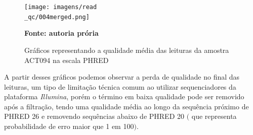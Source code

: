 \begin{figure}[H]
	\caption{Gráficos representando a qualidade média das leituras da amostra ACT094 na escala PHRED}
	\centering
	\texttt{[image: imagens/read\\\_qc/004merged.png]} \\
	\centering
    \begin{small}\textbf{Fonte: autoria prória}\end{small}
\end{figure}
\vspace{\floatsep}

A partir desses gráficos podemos observar a perda de qualidade no final das leituras, um tipo de limitação
técnica comum ao utilizar sequenciadores da plataforma \textit{Illumina}, porém o término em baixa qualidade
pode ser removido após a filtração, tendo uma qualidade média ao longo da sequência próximo de PHRED 26 e
removendo sequências abaixo de PHRED 20 $($ que representa probabilidade de erro maior que 1 em 100$)$.


